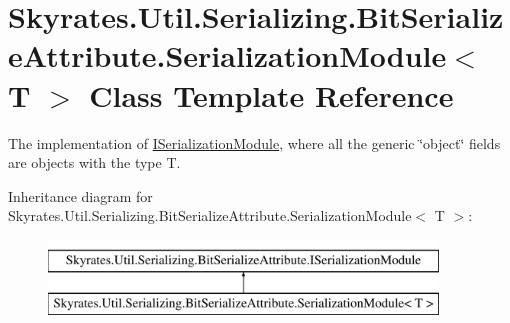 \hypertarget{class_skyrates_1_1_util_1_1_serializing_1_1_bit_serialize_attribute_1_1_serialization_module_3_01_t_01_4}{\section{Skyrates.\-Util.\-Serializing.\-Bit\-Serialize\-Attribute.\-Serialization\-Module$<$ T $>$ Class Template Reference}
\label{class_skyrates_1_1_util_1_1_serializing_1_1_bit_serialize_attribute_1_1_serialization_module_3_01_t_01_4}
}


The implementation of \hyperlink{interface_skyrates_1_1_util_1_1_serializing_1_1_bit_serialize_attribute_1_1_i_serialization_module}{I\-Serialization\-Module}, where all the generic \char`\"{}object\char`\"{} fields are objects with the type T.  


Inheritance diagram for Skyrates.\-Util.\-Serializing.\-Bit\-Serialize\-Attribute.\-Serialization\-Module$<$ T $>$\-:\begin{figure}[H]
\begin{center}
\leavevmode
\includegraphics[height=2.000000cm]{class_skyrates_1_1_util_1_1_serializing_1_1_bit_serialize_attribute_1_1_serialization_module_3_01_t_01_4}
\end{center}
\end{figure}
